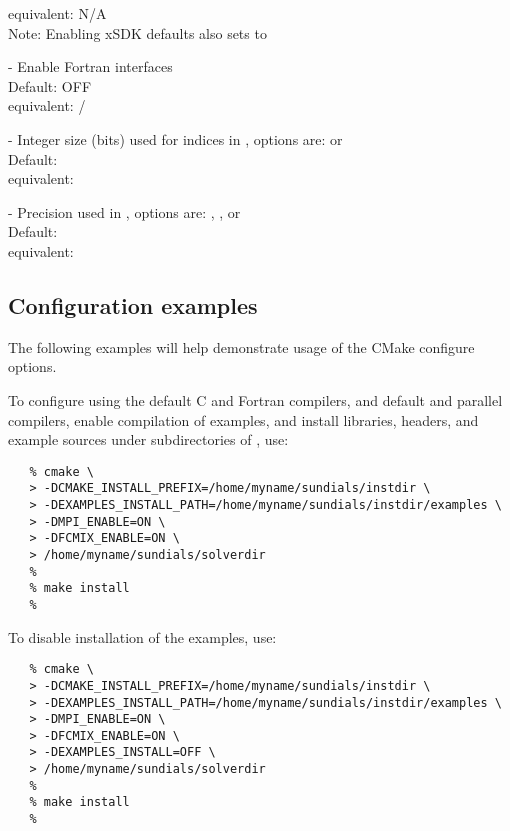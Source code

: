 \begin{description}
  {\sundials} equivalent: N/A
  \\
  Note: Enabling xSDK defaults also sets  to 
\item[\id{XSDK\_ENABLE\_FORTRAN}] -
  Enable {\sundials} Fortran interfaces
  \\
  Default: OFF
  \\
  {\sundials} equivalent: /
\item[\id{XSDK\_INDEX\_SIZE}] -
  Integer size (bits) used for indices in {\sundials}, options are:  or 
  \\
  Default: 
  \\
  {\sundials} equivalent: 
\item[\id{XSDK\_PRECISION}] -
  Precision used in {\sundials}, options are: , , or 
  \\
  Default: 
  \\
  {\sundials} equivalent: 
\end{description}




\subsection{Configuration examples}

The following examples will help demonstrate usage of the CMake configure options.

\noindent To configure {\sundials} using the default C and Fortran compilers,
and default  and  parallel compilers,
enable compilation of examples, and install libraries, headers, and
example sources under subdirectories of
, use:

\begin{verbatim}
   % cmake \
   > -DCMAKE_INSTALL_PREFIX=/home/myname/sundials/instdir \
   > -DEXAMPLES_INSTALL_PATH=/home/myname/sundials/instdir/examples \
   > -DMPI_ENABLE=ON \
   > -DFCMIX_ENABLE=ON \
   > /home/myname/sundials/solverdir
   %
   % make install
   %
\end{verbatim}

\noindent To disable installation of the examples, use:
\begin{verbatim}
   % cmake \
   > -DCMAKE_INSTALL_PREFIX=/home/myname/sundials/instdir \
   > -DEXAMPLES_INSTALL_PATH=/home/myname/sundials/instdir/examples \
   > -DMPI_ENABLE=ON \
   > -DFCMIX_ENABLE=ON \
   > -DEXAMPLES_INSTALL=OFF \
   > /home/myname/sundials/solverdir
   %
   % make install
   %
\end{verbatim}

